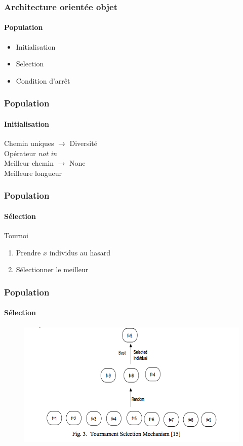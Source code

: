 \documentclass[16pt]{beamer}
\begin{document}
\begin{frame}
  \frametitle{Architecture orientée objet}
  \framesubtitle{\textbf{Population}}
  \begin{itemize}
    \item Initialisation
    \item Selection
    \item Condition d'arrêt
  \end{itemize}
\end{frame}

\begin{frame}
  \frametitle{Population}
  \framesubtitle{Initialisation}
  Chemin uniques $\rightarrow$ Diversité \\
  Opérateur \emph{not in} \\ \pause{}
  Meilleur chemin \pause{} $\rightarrow$ None\\ \pause{}
  Meilleure longueur \\
\end{frame}

\begin{frame}
  \frametitle{Population}
  \framesubtitle{Sélection}
  Tournoi
  \begin{enumerate}
    \item Prendre $x$ individus au hasard
    \item Sélectionner le meilleur 
  \end{enumerate}
\end{frame}

\begin{frame}
  \frametitle{Population}
  \framesubtitle{Sélection}
  \begin{figure}
    \includegraphics[scale=0.4]{tournament.png}
  \end{figure}
\end{frame}
\end{document}
